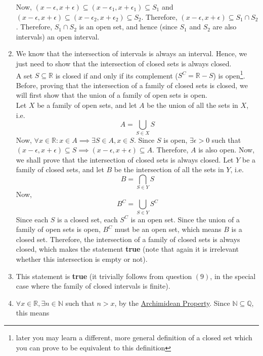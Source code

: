 \documentclass{article}
\begin{document}
\begin{enumerate}
	Now, $(x - \epsilon, x + \epsilon) \subseteq (x - \epsilon_{1}, x + \epsilon_{1}) \subseteq S_{1}$ and $(x - \epsilon, x + \epsilon) \subseteq (x - \epsilon_{2}, x + \epsilon_{2}) \subseteq S_{2}$. Therefore, $(x - \epsilon, x + \epsilon) \subseteq S_{1} \cap S_{2}$.
	Therefore, $S_{1} \cap S_{2}$ is an open set, and hence (since $S_{1}$ and $S_{2}$ are also intervals) an open interval.
	\item We know that the intersection of intervals is always an interval. Hence, we just need to show that the intersection of closed sets is always closed.
	\\ A set $S \subseteq \mathbb{R}$ is closed if and only if its complement ($S^{C} = \mathbb{R} - S$) is open\footnote[3]{later you may learn a different, more general definition of a closed set which you can prove to be equivalent to this definition}. 
	Before, proving that the intersection of a family of closed sets is closed, we will first show that the union of a family of open sets is open.
	\\Let $X$ be a family of open sets, and let $A$ be the union of all the sets in $X$, i.e.
	\begin{equation*}
		A = \bigcup_{S \in X} S
	\end{equation*}
	Now, $\forall x \in \mathbb{R}: x \in A \implies \exists S \in A, x \in S$. Since $S$ is open, $\exists \epsilon > 0$ such that $(x - \epsilon, x + \epsilon) \subseteq S \implies (x - \epsilon, x + \epsilon) \subseteq A$.
	Therefore, $A$ is also open.
	Now, we shall prove that the intersection of closed sets is always closed. Let $Y$ be a family of closed sets, and let $B$ be the intersection of all the sets in $Y$, i.e.
	\begin{equation*}
		B = \bigcap_{S \in Y} S
	\end{equation*}
	Now,
	\begin{equation*}
		B^{C} = \bigcup_{S \in Y} S^{C}
	\end{equation*}
	Since each $S$ is a closed set, each $S^{C}$ is an open set. Since the union of a family of open sets is open, $B^{C}$ must be an open set, which means $B$ is a closed set.
	Therefore, the intersection of a family of closed sets is always closed, which makes the statement \textbf{true} (note that again it is irrelevant whether this intersection is empty or not).
	\item This statement is \textbf{true} (it trivially follows from question $(9)$, in the special case where the family of closed intervals is finite).
	\item $\forall x \in \mathbb{R}, \exists n \in \mathbb{N}$ such that $n > x$, by the \href{https://en.wikipedia.org/wiki/Archimedean_property}{Archimidean Property}. Since $\mathbb{N} \subseteq \mathbb{Q}$, this means

\end{enumerate}
\end{document}
